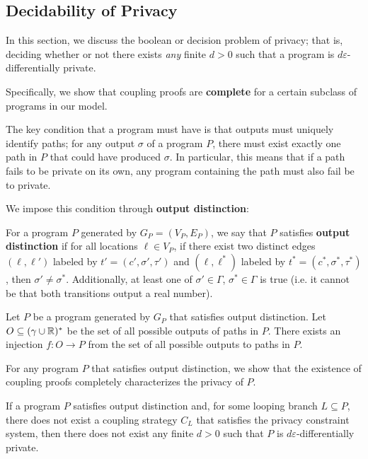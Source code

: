 \subsection{Decidability of Privacy}

In this section, we discuss the boolean or decision problem of privacy; that is, deciding whether or not there exists \textit{any} finite $d>0$ such that a program is $d\varepsilon$-differentially private.

Specifically, we show that coupling proofs are \textbf{complete} for a certain subclass of programs in our model.

The key condition that a program must have is that outputs must uniquely identify paths; for any output $\sigma$ of a program $P$, there must exist exactly one path in $P$ that could have produced $\sigma$. In particular, this means that if a path fails to be private on its own, any program containing the path must also fail be to private. 

We impose this condition through \textbf{output distinction}:

\begin{defn}\label{outputDistinctionDef}
    For a program $P$ generated by $G_P = (V_P, E_P)$, we say that $P$ satisfies \textbf{output distinction} if for all locations $\ell\in V_P$, if there exist two distinct edges $(\ell, \ell')$ labeled by $t'=(c', \sigma', \tau')$ and $(\ell, \ell^*)$ labeled by $t^* = (c^*, \sigma^*, \tau^*)$, then $\sigma' \neq \sigma^*$. Additionally, at least one of $\sigma'\in \Gamma$, $\sigma^*\in \Gamma$ is true (i.e. it cannot be that both transitions output a real number).
\end{defn}

\begin{prop}
    Let $P$ be a program generated by $G_P$ that satisfies output distinction. Let $O\subseteq (\gamma\cup \mathbb{R})^*$ be the set of all possible outputs of paths in $P$. There exists an injection $f: O\to P$ from the set of all possible outputs to paths in $P$. 
\end{prop}

For any program $P$ that satisfies output distinction, we show that the existence of coupling proofs completely characterizes the privacy of $P$.

\begin{thm}\label{ProgramCounterexampleThm}
    If a program $P$ satisfies output distinction and, for some looping branch $L\subseteq P$, there does not exist a coupling strategy $C_L$ that satisfies the privacy constraint system, then there does not exist any finite $d>0$ such that $P$ is $d\varepsilon$-differentially private.
\end{thm}

